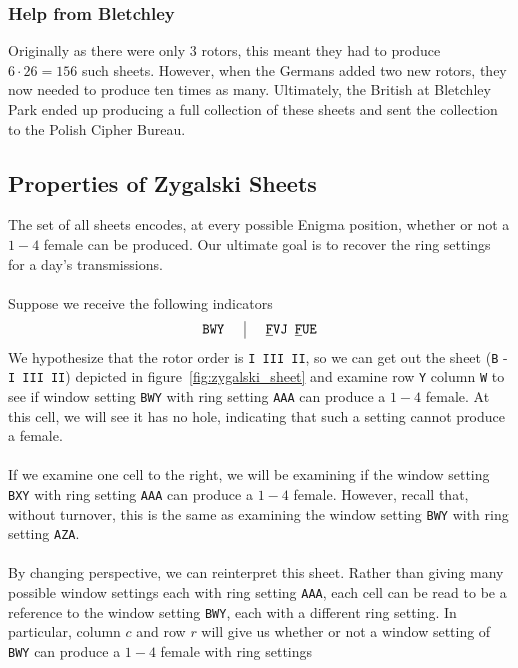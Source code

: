 \subsubsection{Help from Bletchley}
Originally as there were only $3$ rotors, this meant they had to
produce $6\cdot 26 = 156$ such sheets. However, when the Germans
added two new rotors, they now needed to produce ten times as many.
Ultimately, the British at Bletchley Park ended up producing a full
collection of these sheets and sent the collection to the Polish Cipher Bureau.

\subsection{Properties of Zygalski Sheets}
The set of all sheets encodes, at every possible Enigma position,
whether or not a $1-4$ female can be produced. Our ultimate goal is
to recover the ring settings for a day's transmissions.
\\\\Suppose we receive the following indicators
\[
  \setlength{\arraycolsep}{15pt}
  \begin{array}{c | c}
    \texttt{BWY} & {\uline{\texttt{F}}}\texttt{VJ
    }{\uline{\texttt{F}}}\texttt{UE}              \\
  \end{array}
\]
We hypothesize that the rotor order is \texttt{I III II}, so we
can get out the sheet (\texttt{B} - \texttt{I III II}) depicted in
figure~\ref{fig:zygalski_sheet} and examine row \texttt{Y} column
\texttt{W} to see if window setting \texttt{BWY} with ring
setting \texttt{AAA} can produce a $1-4$ female. At this cell, we will
see it has no hole, indicating that such a setting cannot produce a female.
\\\\If we examine one cell to the right, we will be examining if the
window setting \texttt{BXY} with ring setting \texttt{AAA} can
produce a $1-4$ female. However, recall that, without turnover, this
is the same as examining the window setting \texttt{BWY} with ring
setting \texttt{AZA}. 
\\\\By changing perspective, we can reinterpret this sheet. Rather than
giving many possible window settings each with ring setting
\texttt{AAA}, each cell can be read to be a reference to the window
setting \texttt{BWY}, each with a different ring setting. In
particular, column $c$ and row $r$ will give us whether or not a
window setting of \texttt{BWY} can produce a $1-4$ female with ring settings
